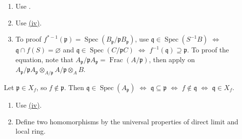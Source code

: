 \begin{exercise}\label{ex3.21}
	\begin{enumerate}[label=\textup{(\roman*)},ref=\theexercise(\roman*)]
		\item[(i),(ii)] Use .
		\item[(iii)] Use \hyperref[ex1.21]{(iv)}.
		\item[(iv)] To proof $f^{*-1}(\mathfrak{p})=\operatorname{Spec}\left(B_\mathfrak{p}/\mathfrak{p}B_\mathfrak{p}\right)$, use $\mathfrak{q}\in\operatorname{Spec}\left(S^{-1}B\right)$ $\Leftrightarrow$ $\mathfrak{q}\cap f(S)=\varnothing$ and $\mathfrak{q}\in\operatorname{Spec}\left(C/\mathfrak{p}C\right)$ $\Leftrightarrow$ $f^{-1}(\mathfrak{q})\supseteq\mathfrak{p}$. To proof the equation, note that $A_\mathfrak{p}/\mathfrak{p}A_\mathfrak{p}=\operatorname{Frac}(A/\mathfrak{p})$, then apply  on $A_\mathfrak{p}/\mathfrak{p}A_\mathfrak{p}\otimes_{A/\mathfrak{p}}A/\mathfrak{p}\otimes_AB$.
	\end{enumerate}
\end{exercise}

\begin{exercise}\label{ex3.22}
	Let $\mathfrak{p}\in X_f$, so $f\notin\mathfrak{p}$. Then $\mathfrak{q}\in\operatorname{Spec}\left(A_\mathfrak{p}\right)$ $\Leftrightarrow$ $\mathfrak{q}\subseteq\mathfrak{p}$ $\Leftrightarrow$ $f\notin\mathfrak{q}$ $\Leftrightarrow$ $\mathfrak{q}\in X_f$.
\end{exercise}

\begin{exercise}\label{ex3.23}
	\begin{enumerate}[label=\textup{(\roman*)},ref=\theexercise(\roman*)]
		\item Use \hyperref[ex1.17]{(iv)}.
		\addtocounter{enumi}{4}
		\item[(v)] Define two homomorphisms by the universal properties of direct limit and local ring.
	\end{enumerate}
\end{exercise}

\begin{exercise}\label{ex3.24}
	
\end{exercise}

\begin{exercise}\label{ex3.25}
	
\end{exercise}

\begin{exercise}\label{ex3.26}
	
\end{exercise}

\begin{exercise}\label{ex3.27}
	
\end{exercise}

\begin{exercise}\label{ex3.28}
	
\end{exercise}

\begin{exercise}\label{ex3.29}
	
\end{exercise}

\begin{exercise}\label{ex3.30}
	
\end{exercise}
